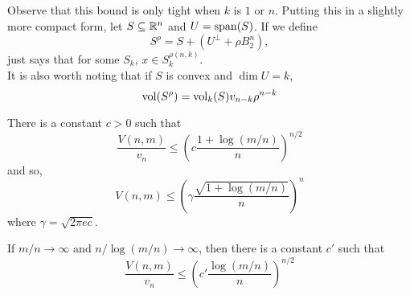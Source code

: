 Observe that this bound is only tight when $k$ is $1$ or $n$. Putting this in a slightly more compact form, let $S\subseteq\mathbb{R}^n$ and $U=\operatorname{span}(S)$. If we define
\[ S^\rho = S + \left(U^\perp + \rho B_2^n\right), \]
 just says that for some $S_k$, $x \in S_k^{\rho(n,k)}$.\\
It is also worth noting that if $S$ is convex and $\dim U = k$,
\begin{equation}
\label{eqn: rho convex body volume}
	\operatorname{vol}(S^\rho) = \operatorname{vol}_k(S) v_{n-k} \rho^{n-k}
\end{equation}

\begin{ftheo}
\label{upper bound on V n m}
There is a constant $c>0$ such that
\[ \frac{V(n,m)}{v_n} \leq \left(c \frac{1+\log(m/n)}{n}\right)^{n/2} \]
and so,
\[ V(n,m) \leq \left(\gamma \frac{\sqrt{1+\log(m/n)}}{n}\right)^{n} \]
where $\gamma=\sqrt{2\pi e c}$.
\end{ftheo}

If $m/n\to\infty$ and $n/\log(m/n)\to\infty$, then there is a constant $c'$ such that
\[ \frac{V(n,m)}{v_n} \leq \left(c' \frac{\log(m/n)}{n}\right)^{n/2} \]

